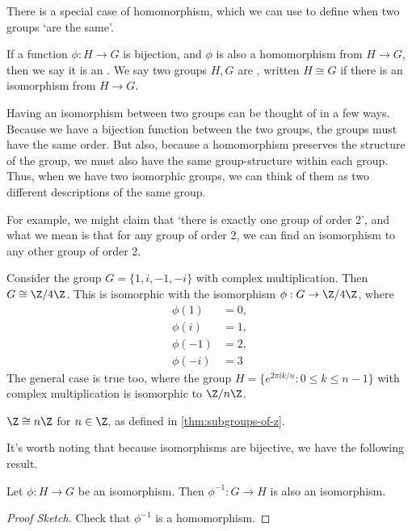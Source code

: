 \documentclass[a4]{scrreprt}
\begin{document}
There is a special case of homomorphism, which we can use to define when two groups `are the same'.

\begin{definition}[Isomorphism]
	If a function $\phi : H \rightarrow G$ is bijection, and $\phi$ is also a homomorphism from $H \rightarrow G$, then we say it is an . We say two groups $H, G$ are , written $H \cong G$ if there is an isomorphism from $H \rightarrow G$.
\end{definition}

Having an isomorphism between two groups can be thought of in a few ways. Because we have a bijection function between the two groups, the groups must have the same order. But also, because a homomorphism preserves the structure of the group, we must also have the same group-structure within each group. Thus, when we have two isomorphic groups, we can think of them as two different descriptions of the same group.

For example, we might claim that `there is exactly one group of order 2', and what we mean is that for any group of order 2, we can find an isomorphism to any other group of order 2. 

\begin{example}
	Consider the group $G = \{ 1, i, -1, -i \}$ with complex multiplication. Then $G \cong \Z / 4 \Z$. This is isomorphic with the isomorphism $\phi : G \rightarrow \Z / 4 \Z$, where
	\begin{align*}
		\phi(1) &= 0, \\
		\phi(i) &= 1, \\
		\phi(-1) &= 2, \\
		\phi(-i) &= 3
	\end{align*}
	The general case is true too, where the group $H = \{  e^{2 \pi i k/n} : 0 \leq k \leq n - 1 \}$ with complex multiplication is isomorphic to $\Z /n \Z$.
\end{example}

\begin{example}
	$\Z \cong n \Z$ for $n \in \Z$, as defined in \autoref{thm:subgroups-of-z}. 
\end{example}

It's worth noting that because isomorphisms are bijective, we have the following result.

\begin{proposition}
	Let $\phi : H \rightarrow G$ be an isomorphism. Then $\phi^{-1} : G \rightarrow H$ is also an isomorphism.
\end{proposition}
\begin{proof}[Proof Sketch]
	Check that $\phi^{-1}$ is a homomorphism.
\end{proof}
\end{document}
